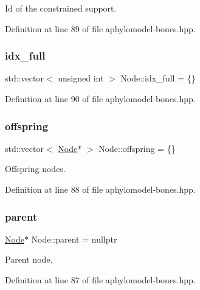 Id of the constrained support. 



Definition at line 89 of file aphylomodel-\/bones.\+hpp.

\mbox{\label{class_node_a33e1dede84aea9685dfad5c0b3baeea7}} 
\subsubsection{\texorpdfstring{idx\+\_\+full}{idx\_full}}
{\footnotesize\ttfamily std\+::vector$<$ unsigned int $>$ Node\+::idx\+\_\+full = \{\}}



Definition at line 90 of file aphylomodel-\/bones.\+hpp.

\mbox{\label{class_node_a4e7e9c69da2575cad9c5fb7865dd42c7}} 
\subsubsection{\texorpdfstring{offspring}{offspring}}
{\footnotesize\ttfamily std\+::vector$<$ \hyperlink{class_node}{Node}$\ast$ $>$ Node\+::offspring = \{\}}



Offspring nodes. 



Definition at line 88 of file aphylomodel-\/bones.\+hpp.

\mbox{\label{class_node_ad8184598cdea70e4bbdfd76f2b0f9e85}} 
\subsubsection{\texorpdfstring{parent}{parent}}
{\footnotesize\ttfamily \hyperlink{class_node}{Node}$\ast$ Node\+::parent = nullptr}



Parent node. 



Definition at line 87 of file aphylomodel-\/bones.\+hpp.

\mbox{\label{class_node_a479513290e6e83b8715f3075dd289ff4}} 
